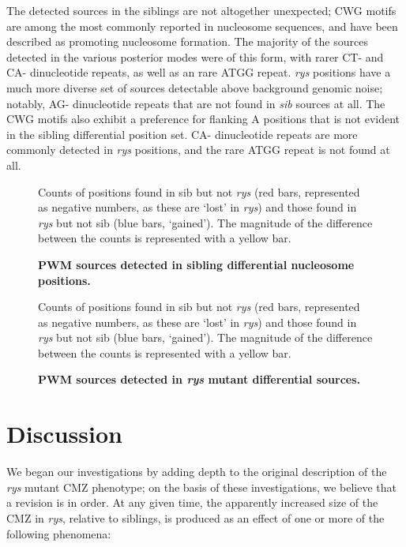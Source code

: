 The detected sources in the siblings are not altogether unexpected; CWG motifs are among the most commonly reported in nucleosome sequences, and have been described as promoting nucleosome formation. The majority of the sources detected in the various posterior modes were of this form, with rarer CT- and CA- dinucleotide repeats, as well as an rare ATGG repeat. \textit{rys} positions have a much more diverse set of sources detectable above background genomic noise; notably, AG- dinucleotide repeats that are not found in \textit{sib} sources at all. The CWG motifs also exhibit a preference for flanking A positions that is not evident in the sibling differential position set. CA- dinucleotide repeats are more commonly detected in \textit{rys} positions, and the rare ATGG repeat is not found at all.

\begin{figure}[!h]
    \caption{{\bf PWM sources detected in sibling differential nucleosome positions.}}
    Counts of positions found in sib but not \textit{rys} (red bars, represented as negative numbers, as these are `lost' in \textit{rys}) and those found in \textit{rys} but not sib (blue bars, `gained'). The magnitude of the difference between the counts is represented with a yellow bar.
    \label{sibmotifs}
\end{figure}

\begin{figure}[!h]
    \caption{{\bf PWM sources detected in \textit{rys} mutant differential sources.}}
    Counts of positions found in sib but not \textit{rys} (red bars, represented as negative numbers, as these are `lost' in \textit{rys}) and those found in \textit{rys} but not sib (blue bars, `gained'). The magnitude of the difference between the counts is represented with a yellow bar.
    \label{rysmotifs}
\end{figure}

\FloatBarrier

\section{Discussion}
We began our investigations by adding depth to the original description of the \textit{rys} mutant CMZ phenotype; on the basis of these investigations, we believe that a revision is in order. At any given time, the apparently increased size of the CMZ in \textit{rys}, relative to siblings, is produced as an effect of one or more of the following phenomena:

